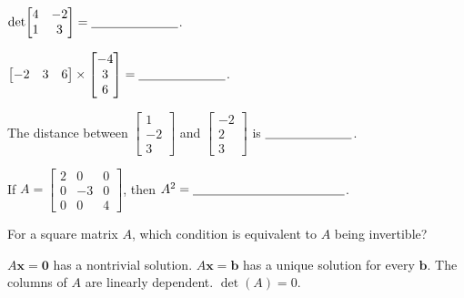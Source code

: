 \documentclass[12pt,a4paper,answers,addpoints]{exam}
\begin{document}
\begin{questions}
\question[2]
$\det\!\begin{bmatrix}4&-2\\1&3\end{bmatrix}=\underline{\hspace{24mm}}$.

\question[2]
$\begin{bmatrix}-2&3&6\end{bmatrix}\times\begin{bmatrix}-4\\3\\6\end{bmatrix}
=\underline{\hspace{24mm}}$.

\question[2]
The distance between $\begin{bmatrix}1\\-2\\3\end{bmatrix}$ and
$\begin{bmatrix}-2\\2\\3\end{bmatrix}$ is $\underline{\hspace{24mm}}$.

\question[2]
If $A=\begin{bmatrix}2&0&0\\0&-3&0\\0&0&4\end{bmatrix}$, then
$A^2=\underline{\hspace{42mm}}$.

\newpage
{}
\vspace{0.3cm}

\question[2]
For a square matrix $A$, which condition is equivalent to $A$ being invertible?
\begin{choices}
    \choice $A\mathbf x=\mathbf 0$ has a nontrivial solution.
    \choice $A\mathbf x=\mathbf b$ has a unique solution for every $\mathbf b$.
    \choice The columns of $A$ are linearly dependent.
    \choice $\det(A)=0$.
\end{choices}


\end{questions}
\end{document}
